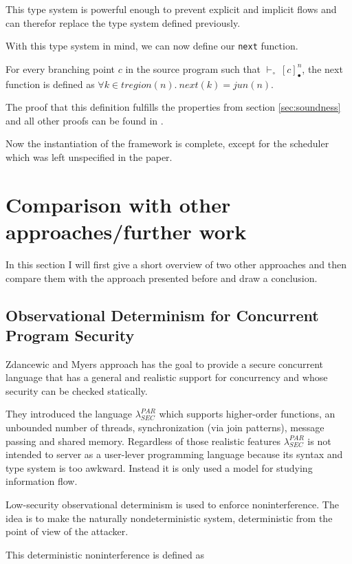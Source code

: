 \documentclass[a4paper,10pt]{llncs}
\begin{document}
This type system is powerful enough to prevent explicit and implicit flows and can therefor
replace the type system defined previously.

With this type system in mind, we can now define our \texttt{next} function.

\begin{definition}
For every branching point $c$ in the source program such that $\vdash_\circ~[c]_\bullet^n$, the next function
is defined as $\forall k \in tregion(n) .\ next(k) = jun(n)$.
\end{definition}

The proof that this definition fulfills the properties from section \ref{sec:soundness} and all other
proofs can be found in \cite{Barthe09}.

Now the instantiation of the framework is complete, except for the scheduler which was left unspecified
in the paper.

\newpage
\section{Comparison with other approaches/further work}
\label{sec:furtherwork}
In this section I will first give a short overview of two other approaches and then
compare them with the approach presented before and draw a conclusion.

\subsection{Observational Determinism for Concurrent Program Security\cite{Zdancewic03}}
Zdancewic and Myers approach has the goal to provide a secure concurrent language
that has a general and realistic support for concurrency and whose security can
be checked statically.

They introduced the language $\lambda_{SEC}^{PAR}$ which supports higher-order functions, an
unbounded number of threads, synchronization (via join patterns), message passing and shared memory. Regardless of those realistic
features $\lambda_{SEC}^{PAR}$ is not intended to server as a user-lever programming language because its
syntax and type system is too awkward. Instead it is only used a model for studying information flow.

Low-security observational determinism is used to enforce noninterference. The idea is
to make the naturally nondeterministic system, deterministic from the point of view
of the attacker.

This deterministic noninterference is defined as
\end{document}
